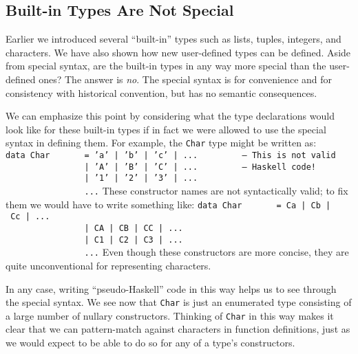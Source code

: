 \subsection{Built-in Types Are Not Special}
\label{tut-built-ins}

Earlier we introduced several ``built-in'' types such as lists,
tuples, integers, and characters.  We have also shown how new
user-defined types can be defined.  Aside from special syntax, are
the built-in types in any way more special than the user-defined ones?
The answer is {\em no}.  The special syntax is for convenience and for
consistency with historical convention, but has no semantic
consequences.

We can emphasize this point by considering what the type
declarations would look like for these built-in types if in fact we
were allowed to use the special syntax in defining them.  For example,
the \mbox{\tt Char} type might be written as:
\bprog
\mbox{\tt data\ Char\ \ \ \ \ \ \ =\ 'a'\ |\ 'b'\ |\ 'c'\ |\ ...\ \ \ \ \ \ \ \ \ --\ This\ is\ not\ valid}\\
\mbox{\tt \ \ \ \ \ \ \ \ \ \ \ \ \ \ \ \ |\ 'A'\ |\ 'B'\ |\ 'C'\ |\ ...\ \ \ \ \ \ \ \ \ --\ Haskell\ code!}\\
\mbox{\tt \ \ \ \ \ \ \ \ \ \ \ \ \ \ \ \ |\ '1'\ |\ '2'\ |\ '3'\ |\ ...}\\
\mbox{\tt \ \ \ \ \ \ \ \ \ \ \ \ \ \ \ \ ...}
\eprog
These constructor names are not syntactically valid; to fix them we
would have to write something like:
\bprog
\mbox{\tt data\ Char\ \ \ \ \ \ \ =\ Ca\ |\ Cb\ |\ Cc\ |\ ...}\\
\mbox{\tt \ \ \ \ \ \ \ \ \ \ \ \ \ \ \ \ |\ CA\ |\ CB\ |\ CC\ |\ ...}\\
\mbox{\tt \ \ \ \ \ \ \ \ \ \ \ \ \ \ \ \ |\ C1\ |\ C2\ |\ C3\ |\ ...}\\
\mbox{\tt \ \ \ \ \ \ \ \ \ \ \ \ \ \ \ \ ...}
\eprog
Even though these constructors are more concise, they are quite
unconventional for representing characters.

In any case, writing ``pseudo-Haskell'' code in this way helps us to
see through the special syntax.  We see now that \mbox{\tt Char} is just an
enumerated type consisting of a large number of nullary constructors.
Thinking of \mbox{\tt Char} in this way makes it clear that we can
pattern-match against characters in function definitions, just as we
would expect to be able to do so for any of a type's constructors.


